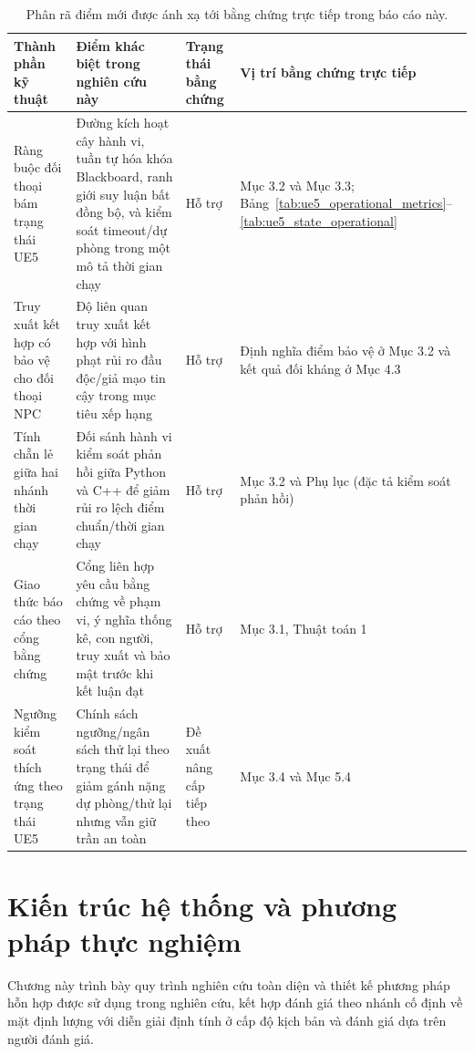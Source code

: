 ﻿\documentclass[a4paper,12pt]{article}
\begin{document}
\begin{table}[t]
\centering
\caption{Phân rã điểm mới được ánh xạ tới bằng chứng trực tiếp trong báo cáo này.}
\label{tab:novelty_decomposition}
\begingroup
\footnotesize
\setlength{\tabcolsep}{3.5pt}
\begin{tabular}{p{}p{}p{}p{}}
\toprule
Thành phần kỹ thuật & Điểm khác biệt trong nghiên cứu này & Trạng thái bằng chứng & Vị trí bằng chứng trực tiếp \\
\midrule
Ràng buộc đối thoại bám trạng thái UE5 & Đường kích hoạt cây hành vi, tuần tự hóa khóa Blackboard, ranh giới suy luận bất đồng bộ, và kiểm soát timeout/dự phòng trong một mô tả thời gian chạy & Hỗ trợ & Mục 3.2 và Mục 3.3; Bảng~\ref{tab:ue5_operational_metrics}--\ref{tab:ue5_state_operational} \\
Truy xuất kết hợp có bảo vệ cho đối thoại NPC & Độ liên quan truy xuất kết hợp với hình phạt rủi ro đầu độc/giả mạo tin cậy trong mục tiêu xếp hạng & Hỗ trợ & Định nghĩa điểm bảo vệ ở Mục 3.2 và kết quả đối kháng ở Mục 4.3 \\
Tính chẵn lẻ giữa hai nhánh thời gian chạy & Đối sánh hành vi kiểm soát phản hồi giữa Python và C++ để giảm rủi ro lệch điểm chuẩn/thời gian chạy & Hỗ trợ & Mục 3.2 và Phụ lục (đặc tả kiểm soát phản hồi) \\
Giao thức báo cáo theo cổng bằng chứng & Cổng liên hợp yêu cầu bằng chứng về phạm vi, ý nghĩa thống kê, con người, truy xuất và bảo mật trước khi kết luận đạt & Hỗ trợ & Mục 3.1, Thuật toán 1 \\
Ngưỡng kiểm soát thích ứng theo trạng thái UE5 & Chính sách ngưỡng/ngân sách thử lại theo trạng thái để giảm gánh nặng dự phòng/thử lại nhưng vẫn giữ trần an toàn & Đề xuất nâng cấp tiếp theo & Mục 3.4 và Mục 5.4 \\
\bottomrule
\end{tabular}
\endgroup
\end{table}

\section{Kiến trúc hệ thống và phương pháp thực nghiệm}
Chương này trình bày quy trình nghiên cứu toàn diện và thiết kế phương pháp hỗn hợp được sử dụng trong nghiên cứu, kết hợp đánh giá theo nhánh cố định về mặt định lượng với diễn giải định tính ở cấp độ kịch bản và đánh giá dựa trên người đánh giá.
\end{document}
